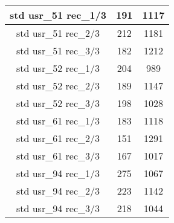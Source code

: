 \begin{tabular}{|c|c|c|}
    \hline
    std usr\_51 rec\_1/3 & 191 & 1117 \\
    \hline
    std usr\_51 rec\_2/3 & 212 & 1181 \\
    \hline
    std usr\_51 rec\_3/3 & 182 & 1212 \\
    \hline
    std usr\_52 rec\_1/3 & 204 & 989 \\
    \hline
    std usr\_52 rec\_2/3 & 189 & 1147 \\
    \hline
    std usr\_52 rec\_3/3 & 198 & 1028 \\
    \hline
    std usr\_61 rec\_1/3 & 183 & 1118 \\
    \hline
    std usr\_61 rec\_2/3 & 151 & 1291 \\
    \hline
    std usr\_61 rec\_3/3 & 167 & 1017 \\
    \hline
    std usr\_94 rec\_1/3 & 275 & 1067 \\
    \hline
    std usr\_94 rec\_2/3 & 223 & 1142 \\
    \hline
    std usr\_94 rec\_3/3 & 218 & 1044 \\
    \hline
\end{tabular}
